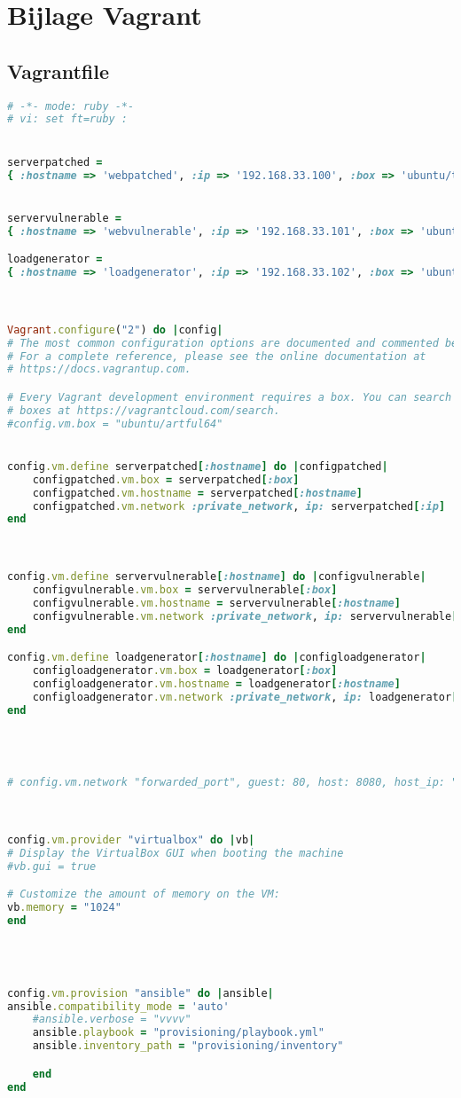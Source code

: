 \section{Bijlage Vagrant}
\subsection{Vagrantfile}
\begin{lstlisting}[language=Ruby, breaklines=true]
# -*- mode: ruby -*-
# vi: set ft=ruby :


serverpatched = 
{ :hostname => 'webpatched', :ip => '192.168.33.100', :box => 'ubuntu/trusty64' }


servervulnerable = 
{ :hostname => 'webvulnerable', :ip => '192.168.33.101', :box => 'ubuntu/trusty64' }

loadgenerator = 
{ :hostname => 'loadgenerator', :ip => '192.168.33.102', :box => 'ubuntu/trusty64' }



Vagrant.configure("2") do |config|
# The most common configuration options are documented and commented below.
# For a complete reference, please see the online documentation at
# https://docs.vagrantup.com.

# Every Vagrant development environment requires a box. You can search for
# boxes at https://vagrantcloud.com/search.
#config.vm.box = "ubuntu/artful64"


config.vm.define serverpatched[:hostname] do |configpatched|
	configpatched.vm.box = serverpatched[:box]
	configpatched.vm.hostname = serverpatched[:hostname]
	configpatched.vm.network :private_network, ip: serverpatched[:ip]
end



config.vm.define servervulnerable[:hostname] do |configvulnerable|
	configvulnerable.vm.box = servervulnerable[:box]
	configvulnerable.vm.hostname = servervulnerable[:hostname]
	configvulnerable.vm.network :private_network, ip: servervulnerable[:ip]
end

config.vm.define loadgenerator[:hostname] do |configloadgenerator|
	configloadgenerator.vm.box = loadgenerator[:box]
	configloadgenerator.vm.hostname = loadgenerator[:hostname]
	configloadgenerator.vm.network :private_network, ip: loadgenerator[:ip]
end




# config.vm.network "forwarded_port", guest: 80, host: 8080, host_ip: "127.0.0.1"



config.vm.provider "virtualbox" do |vb|
# Display the VirtualBox GUI when booting the machine
#vb.gui = true

# Customize the amount of memory on the VM:
vb.memory = "1024"
end




config.vm.provision "ansible" do |ansible|
ansible.compatibility_mode = 'auto'
    #ansible.verbose = "vvvv"
	ansible.playbook = "provisioning/playbook.yml"
	ansible.inventory_path = "provisioning/inventory"

	end
end

\end{lstlisting}


